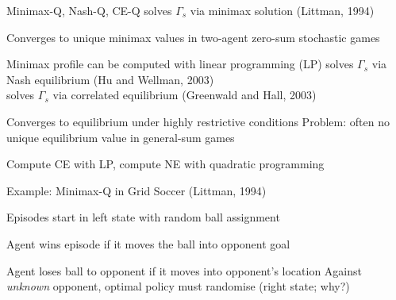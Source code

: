 \begin{frame}{Minimax-Q, Nash-Q, CE-Q}
     solves $\Gamma_s$ via minimax solution (Littman, 1994)
    \blist
        \item Converges to unique minimax values in two-agent zero-sum stochastic games
        \item Minimax profile can be computed with linear programming (LP)
    \elist
     solves $\Gamma_s$ via Nash equilibrium (Hu and Wellman, 2003) \\
     solves $\Gamma_s$ via correlated equilibrium (Greenwald and Hall, 2003)
    \blist
        \item Converges to equilibrium under highly restrictive conditions %
            \listtab Problem: often no unique equilibrium value in general-sum games %
        \item Compute CE with LP, compute NE with quadratic programming
    \elist
\end{frame}

\begin{frame}[t]{Example: Minimax-Q in Grid Soccer (Littman, 1994)}
    \begin{center}
    \end{center}
    \blist
        \item Episodes start in left state with random ball assignment
        \item Agent wins episode if it moves the ball into opponent goal
        \item Agent loses ball to opponent if it moves into opponent's location
    \elist
    Against {\it unknown} opponent, optimal policy must randomise (right state; why?) %
\end{frame}

